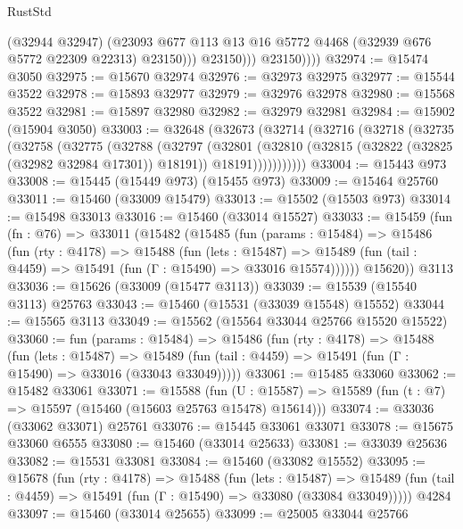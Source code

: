 \begin{lexlean}{RustStd}
\begin{coremodule}
                      (@32944 @32947)
                      (@23093
                        @677
                        @113
                        @13
                        @16
                        @5772
                        @4468
                        (@32939 @676 @5772 @22309 @22313)
                        @23150)))
                  @23150)))
            @23150))))
@32974 := @15474 @3050
@32975 := @15670 @32974
@32976 := @32973 @32975
@32977 := @15544 @3522
@32978 := @15893 @32977
@32979 := @32976 @32978
@32980 := @15568 @3522
@32981 := @15897 @32980
@32982 := @32979 @32981
@32984 := @15902 (@15904 @3050)
@33003 := @32648
    (@32673
      (@32714
        (@32716
          (@32718
            (@32735
              (@32758
                (@32775
                  (@32788
                    (@32797
                      (@32801
                        (@32810
                          (@32815 (@32822 (@32825 (@32982 @32984 @17301)) @18191))
                          @18191)))))))))))
@33004 := @15443 @973
@33008 := @15445 (@15449 @973) (@15455 @973)
@33009 := @15464 @25760
@33011 := @15460 (@33009 @15479)
@33013 := @15502 (@15503 @973)
@33014 := @15498 @33013
@33016 := @15460 (@33014 @15527)
@33033 := @15459
    (fun (fn : @76) =>
    @33011
      (@15482
        (@15485
          (fun (params : @15484) =>
          @15486
            (fun (rty : @4178) =>
            @15488
              (fun (lets : @15487) =>
              @15489 (fun (tail : @4459) => @15491 (fun (Γ : @15490) => @33016 @15574))))))
        @15620))
    @3113
@33036 := @15626 (@33009 (@15477 @3113))
@33039 := @15539 (@15540 @3113) @25763
@33043 := @15460 (@15531 (@33039 @15548) @15552)
@33044 := @15565 @3113
@33049 := @15562 (@15564 @33044 @25766 @15520 @15522)
@33060 := fun (params : @15484) =>
  @15486
    (fun (rty : @4178) =>
    @15488
      (fun (lets : @15487) =>
      @15489 (fun (tail : @4459) => @15491 (fun (Γ : @15490) => @33016 (@33043 @33049)))))
@33061 := @15485 @33060
@33062 := @15482 @33061
@33071 := @15588
    (fun (U : @15587) => @15589 (fun (t : @7) => @15597 (@15460 (@15603 @25763 @15478) @15614)))
@33074 := @33036 (@33062 @33071) @25761
@33076 := @15445 @33061 @33071
@33078 := @15675 @33060 @6555
@33080 := @15460 (@33014 @25633)
@33081 := @33039 @25636
@33082 := @15531 @33081
@33084 := @15460 (@33082 @15552)
@33095 := @15678
    (fun (rty : @4178) =>
    @15488
      (fun (lets : @15487) =>
      @15489 (fun (tail : @4459) => @15491 (fun (Γ : @15490) => @33080 (@33084 @33049)))))
    @4284
@33097 := @15460 (@33014 @25655)
@33099 := @25005 @33044 @25766

\end{coremodule}
\end{lexlean}
